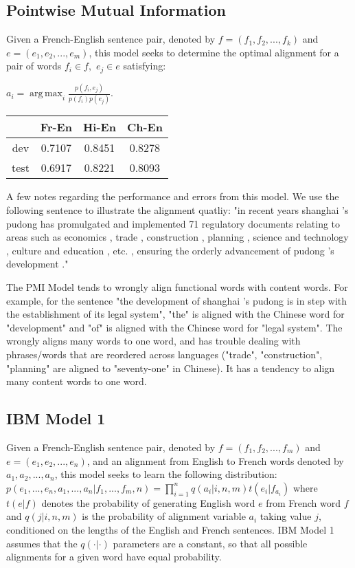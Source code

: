 \documentclass[12pt]{article}
\DeclareMathOperator*{\argmax}{arg\,max}
\begin{document}
\begin{multicols}{2}
\subsection{Pointwise Mutual Information}
  Given a French-English sentence pair, denoted by $f=(f_1,f_2,...,f_k)$
  and $e=(e_1,e_2,...,e_m)$, this model seeks to determine the optimal
  alignment for a pair of words $f_i\in f, $ $e_j\in e$ satisfying: \\
  \begin{center}
  $a_i = \argmax_{i} \frac{p(f_i,e_j)}{p(f_i)p(e_j)}$.
  \end{center}

\begin{center}
\begin{tabular}{ c c c c }
    \hline
    & Fr-En & Hi-En & Ch-En  \\
    \hline
    dev & 0.7107 & 0.8451 & 0.8278 \\
    \hline
    test & 0.6917 & 0.8221 & 0.8093
\end{tabular}
\end{center}

A few notes regarding the performance and errors from this model. We use the following sentence to illustrate the alignment quatliy: "in recent years shanghai 's pudong has promulgated and implemented 71 regulatory documents relating to areas such as economics , trade , construction , planning , science and technology , culture and education , etc. , ensuring the orderly advancement of pudong 's development ."

The PMI Model tends to wrongly align functional words with content words. For example, for the sentence "the development of shanghai 's pudong is in step with the establishment of its legal system", "the" is aligned with the Chinese word for "development" and "of" is aligned with the Chinese word for "legal system". The wrongly aligns many words to one word, and has trouble dealing with phrases/words that are reordered across languages ("trade", "construction", "planning" are aligned to "seventy-one" in Chinese). It has a tendency to align many content words to one word.





\subsection{IBM Model 1}

Given a French-English sentence pair, denoted by $f=(f_1,f_2,...,f_m)$ and $e=(e_1,e_2,...,e_n)$, and an alignment from English to French words denoted by $a_1,a_2,...,a_n$, this model seeks to learn the following distribution: $p(e_1,...,e_n,a_1,...,a_n|f_1,...,f_m,n) =
  \displaystyle\prod_{i=1}^n q(a_i|i,n,m)t(e_i|f_{a_i})$
where $t(e|f)$ denotes the probability of generating English word $e$ from French word $f$ and $q(j|i,n,m)$ is the probability of alignment variable $a_i$ taking value $j$, conditioned on the lengths of the English and French sentences. IBM Model 1 assumes that the $q(\cdot|\cdot)$ parameters are a constant, so that all possible alignments for a given word have equal probability.


\end{multicols}
\end{document}
